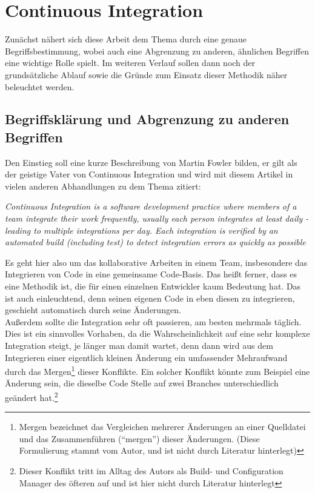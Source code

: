 \pagebreak
\chapter{Continuous Integration}
Zunächst nähert sich diese Arbeit dem Thema durch eine genaue Begriffsbestimmung, wobei auch eine Abgrenzung zu anderen, ähnlichen Begriffen eine wichtige Rolle spielt. Im weiteren Verlauf sollen dann noch der grundsätzliche Ablauf sowie die Gründe zum Einsatz dieser Methodik näher beleuchtet werden.\\
\section{Begriffsklärung und Abgrenzung zu anderen Begriffen}
Den Einstieg soll eine kurze Beschreibung von Martin Fowler bilden, er gilt als der geistige Vater von Continuous Integration und wird mit diesem Artikel in vielen anderen Abhandlungen zu dem Thema zitiert:
\begin{center}
	\textit{
	Continuous Integration is a software development practice where members of a team integrate their work frequently, usually each person integrates at least daily - leading to multiple integrations per day. Each integration is verified by an automated build (including test) to detect integration errors as quickly as possible}\\ \cite{fowler-CI}
\end{center}
Es geht hier also um das kollaborative Arbeiten in einem Team, insbesondere das Integrieren von Code in eine gemeinsame Code-Basis. Das heißt ferner, dass es eine Methodik ist, die für einen einzelnen Entwickler kaum Bedeutung hat. Das ist auch einleuchtend, denn seinen eigenen Code in eben diesen zu integrieren, geschieht automatisch durch seine Änderungen. \\
Außerdem sollte die Integration sehr oft passieren, am besten mehrmals täglich. Dies ist ein sinnvolles Vorhaben, da die Wahrscheinlichkeit auf eine sehr komplexe Integration steigt, je länger man damit wartet, denn dann wird aus dem Integrieren einer eigentlich kleinen Änderung ein umfassender Mehraufwand durch das Mergen\footnote{Mergen bezeichnet das Vergleichen mehrerer Änderungen an einer Quelldatei und das Zusammenführen ("`mergen"') dieser Änderungen. (Diese Formulierung stammt vom Autor, und ist nicht durch Literatur hinterlegt)} dieser Konflikte. Ein solcher Konflikt könnte zum Beispiel eine Änderung sein, die dieselbe Code Stelle auf zwei Branches unterschiedlich geändert hat.\footnote{Dieser Konflikt tritt im Alltag des Autors als Build- und Configuration Manager des öfteren auf und ist hier nicht durch Literatur hinterlegt} \\
